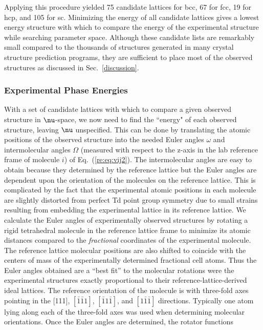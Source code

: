 \documentclass[preprint]{iucr}              %
\newcommand{\mb}[1]{\ensuremath{\mbox{\boldmath $ #1 $}}}
\begin{document}
Applying this procedure yielded 75 candidate lattices for bcc, 67 for fcc, 19
for hcp, and 105 for sc. Minimizing the energy of all
candidate lattices gives a lowest energy structure with which to
compare the energy of the experimental structure while searching
parameter space.  Although these candidate lists are remarkably small compared
to the thousands of structures generated in many crystal structure prediction
programs, they are sufficient to place most of the observed structures as
discussed in Sec.~\ref{discussion}.


\subsubsection{Experimental Phase Energies}

With a set of candidate lattices with which to compare a given observed
structure in $\mb{\nu}$-space, we now need to find the ``energy" of each
observed structure, leaving $\mb{\nu}$ unspecified.  This can be done by
translating the atomic positions of the observed structure into the needed Euler
angles $\omega$ and intermolecular angles $\Omega$ (measured with respect to the
z-axis in the lab reference frame of molecule $i$) of Eq.\
(\ref{re:eq:vij2}). The intermolecular angles are easy to obtain because they
determined by the reference lattice but the Euler angles are dependent upon the orientation of the molecules on the reference lattice. This is complicated by the fact that the experimental atomic positions in each molecule are slightly
distorted from perfect Td point group symmetry due to small strains resulting
from embedding the
experimental lattice in its reference lattice. We calculate the
Euler angles of experimentally observed structures by rotating a
rigid tetrahedral molecule in the reference lattice frame to
minimize its atomic distances compared to the \emph{fractional}
coordinates of the experimental molecule. The reference lattice
molecular positions are also shifted to coincide with the centers of
mass of the experimentally determined fractional cell atoms. Thus
the Euler angles obtained are a ``best fit'' to the molecular
rotations were the experimental structures exactly proportional to
their reference-lattice-derived ideal lattices. The reference orientation of the molecule is with
three-fold axes pointing in the [111], $[\bar{1}\bar{1}1]$,
$[\bar{1}1\bar{1}]$, and $[1\bar{1}\bar{1}]$ directions. Typically
one atom lying along each of the three-fold axes was used when
determining molecular orientations. Once the
Euler angles are determined, the rotator functions
\end{document}
